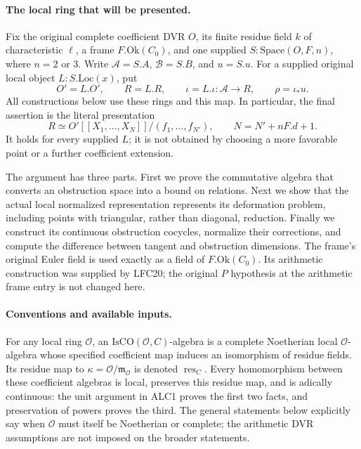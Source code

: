 \documentclass[11pt,a4paper]{article}
\numberwithin{equation}{section}
\theoremstyle{remark}\newtheorem{remark}[theorem]{Remark}
\begin{document}
\paragraph{The local ring that will be presented.}
Fix the original complete coefficient DVR \(O\), its finite residue
field \(k\) of characteristic \(\ell\), a frame
\(F.\mathrm{Ok}(C_0)\), and one supplied
\(S:\mathrm{Space}(O,F,n)\), where \(n=2\) or \(3\).
Write \(\mathcal A=S.A\), \(\mathcal B=S.B\), and
\(u=S.u\).  For a supplied original local object
\(L:S.\mathrm{Loc}(x)\), put
\[
 O'=L.O',\qquad R=L.R,\qquad
 \iota=L.\iota:\mathcal A\longrightarrow R,
 \qquad \rho=\iota_*u.                                      \tag{APD.1}
\]
All constructions below use these rings and this map.  In particular,
the final assertion is the literal presentation
\[
 R\simeq O'[[X_1,\ldots,X_N]]/(f_1,\ldots,f_{N'}),
 \qquad N=N'+nF.d+1.                                      \tag{APD.2}
\]
It holds for every supplied \(L\); it is not obtained by choosing a
more favorable point or a further coefficient extension.

The argument has three parts.  First we prove the commutative algebra
that converts an obstruction space into a bound on relations.  Next
we show that the actual local normalized representation represents its
deformation problem, including points with triangular, rather than
diagonal, reduction.  Finally we construct its continuous obstruction
cocycles, normalize their corrections, and compute the difference
between tangent and obstruction dimensions.  The frame's original
Euler field is used exactly as a field of \(F.\mathrm{Ok}(C_0)\).
Its arithmetic construction was supplied by LFC20; the original
\(P\) hypothesis at the arithmetic frame entry is not changed here.

\paragraph{Conventions and available inputs.}
For any local ring \(\mathcal O\), an
\(\mathrm{IsCO}(\mathcal O,C)\)-algebra is a complete Noetherian
local \(\mathcal O\)-algebra whose specified coefficient map induces
an isomorphism of residue fields.  Its residue map to
\(\kappa=\mathcal O/\mathfrak m_{\mathcal O}\) is denoted
\(\operatorname{res}_C\).  Every homomorphism between these coefficient
algebras is local, preserves this residue map, and is adically
continuous: the unit argument in ALC1 proves the first two facts,
and preservation of powers proves the third.  The general statements
below explicitly say when \(\mathcal O\) must itself be Noetherian
or complete; the arithmetic DVR assumptions are not imposed on the
broader statements.
\end{document}
